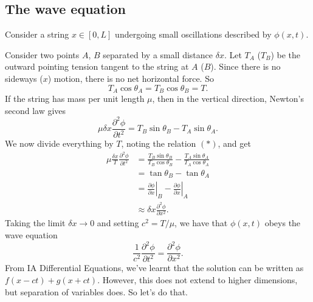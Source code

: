 \documentclass[a4paper]{article}
\begin{document}
\subsection{The wave equation}
Consider a string $x\in [0, L]$ undergoing small oscillations described by $\phi(x, t)$.
\begin{center}
\end{center} %
Consider two points $A$, $B$ separated by a small distance $\delta x$. Let $T_A$ ($T_B$) be the outward pointing tension tangent to the string at $A$ ($B$). Since there is no sideways ($x$) motion, there is no net horizontal force. So
\[
  T_A\cos \theta_A = T_B \cos \theta_B = T.\tag{$*$}
\]
If the string has mass per unit length $\mu$, then in the vertical direction, Newton's second law gives
\[
  \mu \delta x \frac{\partial^2 \phi}{\partial t^2} = T_B \sin \theta_B - T_A \sin \theta_A.
\]
We now divide everything by $T$, noting the relation $(*)$, and get
\begin{align*}
  \mu \frac{\delta x}{T}\frac{\partial^2 \phi}{\partial t^2} &= \frac{T_B \sin \theta_B}{T_B\cos \theta_B} - \frac{T_A \sin \theta_A}{T_A \cos \theta_A}\\
  &= \tan \theta_B - \tan \theta_A\\
  &= \left.\frac{\partial\phi}{\partial x}\right|_B - \left.\frac{\partial\phi}{\partial x}\right|_A\\
  &\approx \delta x\frac{\partial^2 \phi}{\partial x^2}.
\end{align*}
Taking the limit $\delta x \to 0$ and setting $c^2 = T/\mu$, we have that $\phi(x, t)$ obeys the wave equation
\[
  \frac{1}{c^2} \frac{\partial^2 \phi}{\partial t^2} = \frac{\partial^2 \phi}{\partial x^2}.
\]
From IA Differential Equations, we've learnt that the solution can be written as $f(x - ct) + g(x + ct)$. However, this does not extend to higher dimensions, but separation of variables does. So let's do that.
\end{document}

